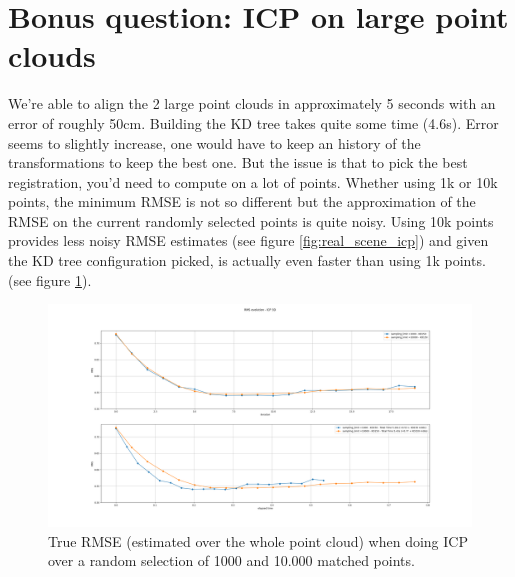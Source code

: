 \documentclass[a4paper]{article}
\begin{document}
\section*{Bonus question: ICP on large point clouds}
We're able to align the 2 large point clouds in approximately 5 seconds with an error of roughly 50cm. Building the KD tree takes quite some time (4.6s). Error seems to slightly increase, one would have to keep an history of the transformations to keep the best one. But the issue is that to pick the best registration, you'd need to compute on a lot of points. Whether using 1k or 10k points, the minimum RMSE is not so different but the approximation of the RMSE on the current randomly selected points is quite noisy.
Using 10k points provides less noisy RMSE estimates (see figure \ref{fig:real_scene_icp}) and given the KD tree configuration picked, is actually even faster than using 1k points. (see figure \ref{fig:real_scene_icp_true}). 

\begin{figure}[H]
  \centering
  \includegraphics[width=1.\linewidth]{figures/RMS_random_sampling_limit_1k_vs_10k.png}
  \caption{True RMSE (estimated over the whole point cloud) when doing ICP over a random selection of 1000 and 10.000 matched points.}
  \label{fig:real_scene_icp_true}
\end{figure}

\end{document}
